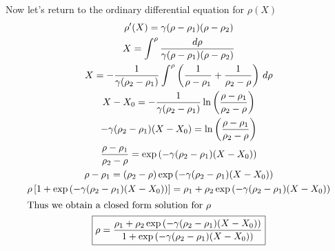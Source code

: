 \begin{Solution}
\begin{enumerate}
    Now let's return to the ordinary differential equation
    for $\rho(X)$
    \begin{gather*}
      \rho'(X) = \gamma(\rho-\rho_1)(\rho-\rho_2) \\
      X = \int^\rho \frac{d\rho}{\gamma(\rho-\rho_1)(\rho-\rho_2)} \\
      X = -\frac{1}{\gamma(\rho_2-\rho_1)} \int^\rho \left( \frac{1}{\rho-\rho_1}
        + \frac{1}{\rho_2-\rho} \right)\,d\rho \\
      X - X_0 = -\frac{1}{\gamma(\rho_2-\rho_1)} \ln\left(\frac{\rho-\rho_1}
        {\rho_2-\rho}\right) \\
      -\gamma(\rho_2-\rho_1)(X-X_0) = \ln\left(\frac{\rho-\rho_1}
        {\rho_2-\rho}\right) \\
      \frac{\rho-\rho_1}{\rho_2-\rho} = \exp\left(-\gamma(\rho_2-\rho_1)(X-X_0)
      \right) \\
      \rho-\rho_1 = (\rho_2-\rho)\exp\left(-\gamma(\rho_2-\rho_1)(X-X_0)\right) \\
      \rho\left[1 + \exp\left(-\gamma(\rho_2-\rho_1)(X-X_0)\right)\right]
      = \rho_1+\rho_2 \exp\left(-\gamma(\rho_2-\rho_1)(X-X_0)\right) \\
      \intertext{Thus we obtain a closed form solution for $\rho$}
      \boxed{ \rho = \frac{\rho_1+\rho_2 \exp\left(-\gamma(\rho_2-\rho_1)(X-X_0)
          \right)}{1 + \exp\left(-\gamma(\rho_2-\rho_1)(X-X_0)\right)} }
    \end{gather*}
  \end{enumerate}
\end{Solution}



